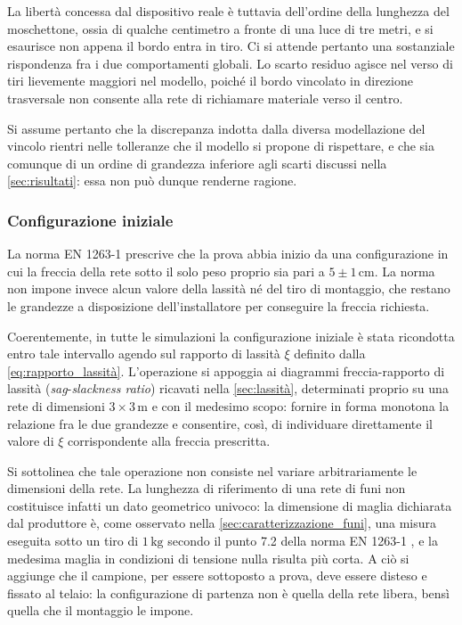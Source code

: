 La libertà concessa dal dispositivo reale è tuttavia dell'ordine della lunghezza del moschettone, ossia di qualche centimetro a fronte di una luce di tre metri, e si esaurisce non appena il bordo entra in tiro. Ci si attende pertanto una sostanziale rispondenza fra i due comportamenti globali. Lo scarto residuo agisce nel verso di tiri lievemente maggiori nel modello, poiché il bordo vincolato in direzione trasversale non consente alla rete di richiamare materiale verso il centro.

Si assume pertanto che la discrepanza indotta dalla diversa modellazione del vincolo rientri nelle tolleranze che il modello si propone di rispettare, e che sia comunque di un ordine di grandezza inferiore agli scarti discussi nella \cref{sec:risultati}: essa non può dunque renderne ragione.

\subsubsection{Configurazione iniziale}
\label{sec:configurazione_iniziale}

La norma EN 1263-1 \cite{EN1263-1} prescrive che la prova abbia inizio da una configurazione in cui la freccia della rete sotto il solo peso proprio sia pari a $5\pm1\,\text{cm}$. La norma non impone invece alcun valore della lassità né del tiro di montaggio, che restano le grandezze a disposizione dell'installatore per conseguire la freccia richiesta.

Coerentemente, in tutte le simulazioni la configurazione iniziale è stata ricondotta entro tale intervallo agendo sul rapporto di lassità $\xi$ definito dalla \eqref{eq:rapporto_lassità}. L'operazione si appoggia ai diagrammi freccia-rapporto di lassità (\textit{sag}-\textit{slackness ratio}) ricavati nella \cref{sec:lassità}, determinati proprio su una rete di dimensioni $3\times3\,\text{m}$ e con il medesimo scopo: fornire in forma monotona la relazione fra le due grandezze e consentire, così, di individuare direttamente il valore di $\xi$ corrispondente alla freccia prescritta.

Si sottolinea che tale operazione non consiste nel variare arbitrariamente le dimensioni della rete. La lunghezza di riferimento di una rete di funi non costituisce infatti un dato geometrico univoco: la dimensione di maglia dichiarata dal produttore è, come osservato nella \cref{sec:caratterizzazione_funi}, una misura eseguita sotto un tiro di $1\,\text{kg}$ secondo il punto 7.2 della norma EN 1263-1 \cite{EN1263-1}, e la medesima maglia in condizioni di tensione nulla risulta più corta. A ciò si aggiunge che il campione, per essere sottoposto a prova, deve essere disteso e fissato al telaio: la configurazione di partenza non è quella della rete libera, bensì quella che il montaggio le impone.

